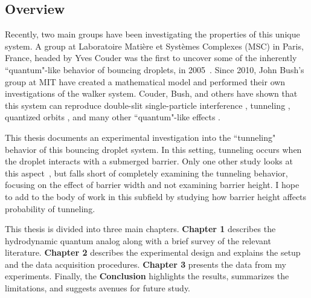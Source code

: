 	  
\subsection*{Overview}	  
	  
	Recently, two main groups have been investigating the properties of this unique system. A group at Laboratoire Mati\`{e}re et Syst\`{e}mes Complexes (MSC) in Paris, France, headed by Yves Couder was the first to uncover some of the inherently ``quantum"-like behavior of bouncing droplets, in 2005~\cite{Couder2005b}. Since 2010, John Bush's group at MIT have created a mathematical model and performed their own investigations of the walker system. Couder, Bush, and others have shown that this system can reproduce double-slit single-particle interference , tunneling , quantized orbits , and many other ``quantum"-like effects . 
		
	This thesis documents an experimental investigation into the ``tunneling" behavior of this bouncing droplet system. In this setting, tunneling occurs when the droplet interacts with a submerged barrier. Only one other study looks at this aspect~\cite{tunneling}, but falls short of completely examining the tunneling behavior, focusing on the effect of barrier width and not examining barrier height. I hope to add to the body of work in this subfield by studying how barrier height affects probability of tunneling.   
	
	This thesis is divided into three main chapters. \textbf{Chapter 1} describes the hydrodynamic quantum analog along with a brief survey of the relevant literature. \textbf{Chapter 2} describes the experimental design and explains the setup and the data acquisition procedures. \textbf{Chapter 3} presents the data from my experiments. Finally, the \textbf{Conclusion} highlights the results, summarizes the limitations, and suggests avenues for future study. 